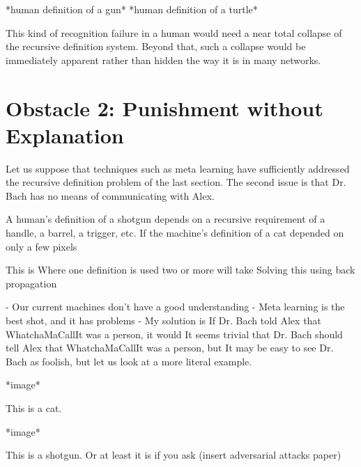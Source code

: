 \documentclass{article}
\newcommand{\br}{ \hfill \break}
\begin{document}
\begin{adjustwidth}{2.5em}{0pt}
*human definition of a gun*
*human definition of a turtle*

This kind of recognition failure in a human would need a near total collapse of the recursive definition system. Beyond that, such a collapse would be immediately apparent rather than hidden the way it is in many networks.

\section{Obstacle 2: Punishment without Explanation}

Let us suppose that techniques such as meta learning have sufficiently addressed the recursive definition problem of the last section. The second issue is that Dr. Bach has no means of communicating with Alex.


A human's definition of a shotgun depends on a recursive requirement of a handle, a barrel, a trigger, etc. 
If the machine's definition of a cat depended on only a few pixels 

This is  Where one definition is used two or more will take 
Solving this using back propagation

- Our current machines don't have a good understanding
- Meta learning is the best shot, and it has problems
- My solution is 
If Dr. Bach told Alex that WhatchaMaCallIt was a person, it would
It seems trivial that Dr. Bach should tell Alex that WhatchaMaCallIt was a person, but 
It may be easy to see Dr. Bach as foolish, but let us look at a more literal example.

*image*

This is a cat.

*image*

This is a shotgun. Or at least it is if you ask (insert adversarial attacks paper)
\end{adjustwidth} \br 
\end{document}
